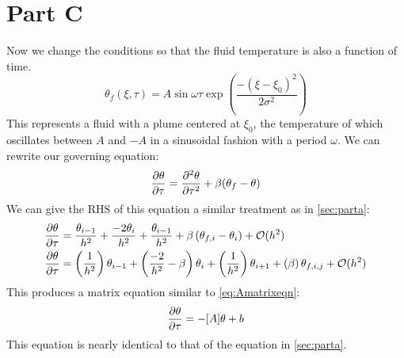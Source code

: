 \documentclass[10pt,letterpaper,notitlepage]{article}
\begin{document}
    \section{Part C}
    Now we change the conditions so that the fluid temperature is also a function of time.
    \begin{equation}
        \theta_f(\xi, \tau) = A \sin{\omega \tau} \exp{\left(\frac{-(\xi-\xi_0)^2}{2 \sigma ^2}\right)}
        \label{eq:thetaf_dynamic}
    \end{equation}
    This represents a fluid with a plume centered at $\xi_0$, the temperature of which oscillates between $A$ and $-A$ in a sinusoidal fashion with a period $\omega$.
    We can rewrite our governing equation:
    \begin{equation}
        \pdv{\theta}{\tau} = \pdv[2]{\theta}{\tau} + \beta (\theta_f - \theta)
        \label{eq:governing_time}
    \end{equation}
    We can give the RHS of this equation a similar treatment as in \cref{sec:parta}:
    \begin{align}
        \pdv{\theta}{\tau} &= \frac{\theta_{i-1}}{h^2} + \frac{-2 \theta_i}{h^2} + \frac{\theta_{i-1}}{h^2}+ \beta \left(\theta_{f,i} - \theta_i \right) + \mathcal{O}(h^2) \\
        \pdv{\theta}{\tau} &= 
        \left(\frac{1}{h^2}\right) \theta_{i-1} + 
        \left(\frac{-2}{h^2} - \beta \right) \theta_i +
        \left(\frac{1}{h^2}\right) \theta_{i+1} + 
        \left(\beta\right) \theta_{f,i,j} + 
        \mathcal{O}(h^2)
        \label{eq:explicit_time}
    \end{align}
    This produces a matrix equation similar to \cref{eq:Amatrixeqn}:
    \begin{equation}
        \pdv{\theta}{\tau} = -[A] \theta + b 
    \end{equation}
    This equation is nearly identical to that of the equation in \cref{sec:parta}.
\end{document}
